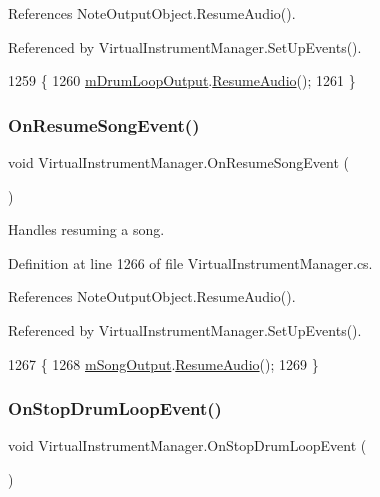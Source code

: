 References Note\+Output\+Object.\+Resume\+Audio().



Referenced by Virtual\+Instrument\+Manager.\+Set\+Up\+Events().


\begin{DoxyCode}
1259     \{
1260         \hyperlink{group___v_i_m_priv_ga5f71cb71d240042312dcc13b481b068d}{mDrumLoopOutput}.\hyperlink{group___n_o_o_pub_func_ga2df8edec357dd4123146c9a7e8485ffb}{ResumeAudio}();
1261     \}
\end{DoxyCode}
\mbox{\label{group___v_i_m_handlers_gaca3d2c89672fe0eb3d94b3cb2072de59}} 
\subsubsection{\texorpdfstring{On\+Resume\+Song\+Event()}{OnResumeSongEvent()}}
{\footnotesize\ttfamily void Virtual\+Instrument\+Manager.\+On\+Resume\+Song\+Event (\begin{DoxyParamCaption}{ }\end{DoxyParamCaption})}



Handles resuming a song. 



Definition at line 1266 of file Virtual\+Instrument\+Manager.\+cs.



References Note\+Output\+Object.\+Resume\+Audio().



Referenced by Virtual\+Instrument\+Manager.\+Set\+Up\+Events().


\begin{DoxyCode}
1267     \{
1268         \hyperlink{group___v_i_m_priv_gaa8d4f5642f5ac4dca4f4178b0052c78d}{mSongOutput}.\hyperlink{group___n_o_o_pub_func_ga2df8edec357dd4123146c9a7e8485ffb}{ResumeAudio}();
1269     \}
\end{DoxyCode}
\mbox{\label{group___v_i_m_handlers_ga9d251d8b2036a3416680ced5d6125d0e}} 
\subsubsection{\texorpdfstring{On\+Stop\+Drum\+Loop\+Event()}{OnStopDrumLoopEvent()}}
{\footnotesize\ttfamily void Virtual\+Instrument\+Manager.\+On\+Stop\+Drum\+Loop\+Event (\begin{DoxyParamCaption}{ }\end{DoxyParamCaption})}



